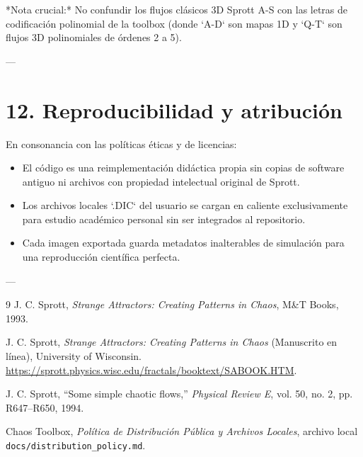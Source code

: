 \documentclass[11pt]{article}
\newcommand{\code}[1]{\texttt{#1}}
\begin{document}
*Nota crucial:* No confundir los flujos clásicos 3D Sprott A-S con las letras de codificación polinomial de la toolbox (donde `A-D` son mapas 1D y `Q-T` son flujos 3D polinomiales de órdenes 2 a 5).

---

\section{12. Reproducibilidad y atribución}

En consonancia con las políticas éticas y de licencias:
\begin{itemize}
  \item El código es una reimplementación didáctica propia sin copias de software antiguo ni archivos con propiedad intelectual original de Sprott.
  \item Los archivos locales `.DIC` del usuario se cargan en caliente exclusivamente para estudio académico personal sin ser integrados al repositorio.
  \item Cada imagen exportada guarda metadatos inalterables de simulación para una reproducción científica perfecta.
\end{itemize}

---

\begin{thebibliography}{9}
J. C. Sprott, \emph{Strange Attractors: Creating Patterns in Chaos}, M\&T Books, 1993.

J. C. Sprott, \emph{Strange Attractors: Creating Patterns in Chaos} (Manuscrito en línea), University of Wisconsin. \url{https://sprott.physics.wisc.edu/fractals/booktext/SABOOK.HTM}.

J. C. Sprott, ``Some simple chaotic flows,'' \emph{Physical Review E}, vol. 50, no. 2, pp. R647--R650, 1994.

Chaos Toolbox, \emph{Política de Distribución Pública y Archivos Locales}, archivo local \code{docs/distribution\_policy.md}.
\end{thebibliography}
\end{document}

